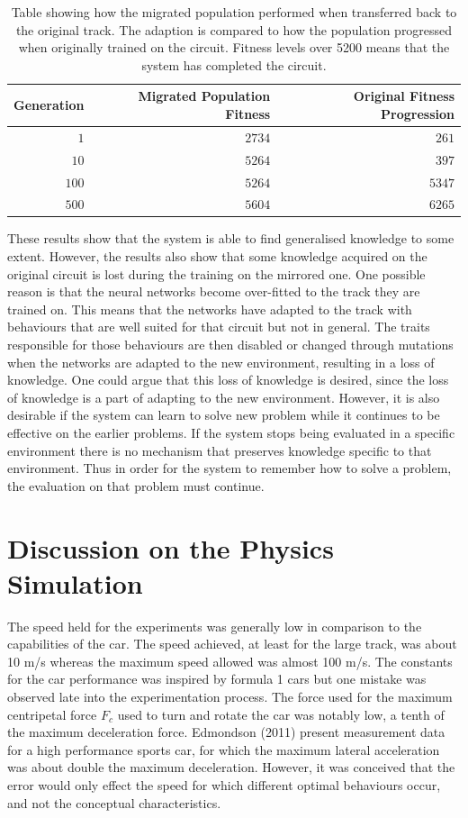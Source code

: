 \begin{table}[H] 
  \centering
  \begin{tabular}{rrr}
    \toprule
    Generation & Migrated Population Fitness & Original Fitness Progression\\
    \midrule
    $1$     & $2734$ & $261$    \\
    $10$    & $5264$ & $397$    \\
    $100$   & $5264$ & $5347$   \\
    $500$   & $5604$ & $6265$   \\
    \bottomrule
  \end{tabular}
  \caption{Table showing how the migrated population performed when transferred back to the original track. The adaption is compared to how the population progressed when originally trained on the circuit. Fitness levels over 5200 means that the system has completed the circuit.}
  \label{tab:mirrored_back}
\end{table}

These results show that the system is able to find generalised knowledge to some extent. However, the results also show that some knowledge acquired on the original circuit is lost during the training on the mirrored one. One possible reason is that the neural networks become over-fitted to the track they are trained on. This means that the networks have adapted to the track with behaviours that are well suited for that circuit but not in general. The traits responsible for those behaviours are then disabled or changed through mutations when the networks are adapted to the new environment, resulting in a loss of knowledge. One could argue that this loss of knowledge is desired, since the loss of knowledge is a part of adapting to the new environment. However, it is also desirable if the system can learn to solve new problem while it continues to be effective on the earlier problems. If the system stops being evaluated in a specific environment there is no mechanism that preserves knowledge specific to that environment. Thus in order for the system to remember how to solve a problem, the evaluation on that problem must continue. 


\section{Discussion on the Physics Simulation}
The speed held for the experiments was generally low in comparison to the capabilities of the car. The speed achieved, at least for the large track, was about 10 m/s whereas the maximum speed allowed was almost 100 m/s. The constants for the car performance was inspired by formula 1 cars but one mistake was observed late into the experimentation process. The force used for the maximum centripetal force $F_c$ used to turn and rotate the car was notably low, a tenth of the maximum deceleration force. Edmondson (2011) present measurement data for a high performance sports car, for which the maximum lateral acceleration was about double the maximum deceleration. However, it was conceived that the error would only effect the speed for which different optimal behaviours occur, and not the conceptual characteristics.

